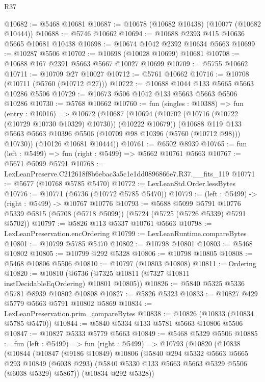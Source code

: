 \begin{lexlean}{R37}
\begin{coremodule}
@10682 := @5468 @10681
@10687 := @10678 (@10682 @10438) (@10077 (@10682 @10444))
@10688 := @5746 @10662
@10694 := @10688 @2393 @415 @10636 @5665 @10681 @10438
@10698 := @10674 @1042 @2392 @10634 @5663
@10699 := @10287 @5506
@10702 := @10698 (@10028 @10699) @10681
@10708 := @10688 @167 @2391 @5663 @5667 @10027 @10699
@10709 := @5755 @10662
@10711 := @10709 @27 @10027
@10712 := @5761 @10662
@10716 := @10708 (@10711 (@5760 (@10712 @27)))
@10722 := @10688 @1044 @133 @5665 @5663 @10286 @5506
@10729 := @10673 @506 @1042 @133 @5663 @5663 @5506 @10286
@10730 := @5768 @10662
@10760 := fun (singles : @10388) =>
  fun (entry : @10016) =>
  @10672
    (@10687
      (@10694
        (@10702 (@10716 (@10722 (@10729 @10730 @10329) @10730)) (@10222 @10679))
        (@10688 @119 @133 @5663 @5663 @10396 @5506 (@10709 @98 @10396 (@5760 (@10712 @98))) @10730))
      (@10126 @10681 @10444))
@10761 := @6502 @8939
@10765 := fun (left : @5499) => fun (right : @5499) => @5662 @10761 @5663
@10767 := @5671 @5099 @5791
@10768 := LexLeanPreserve.C212618f8b6ebac3a5c1e1dd0896866e7.R37.__fits_119
@10771 := @5677 (@10768 @5785 @5470)
@10772 := LexLeanStd.Order.lessBytes
@10776 := @10771 (@6736 (@10772 @5785 @5470))
@10779 := (left : @5499) -> (right : @5499) -> @10767 @10776
@10793 := @5688
    @5099
    @5791
    @10776
    @5339
    @5815
    (@5708 (@5718 @5099))
    (@5724 (@5725 (@5726 @5339) @5791 @5702))
@10797 := @5826 @113 @5337 @10761 @5663
@10798 := LexLeanPreservation.encOrdering
@10799 := LexLeanRuntime.compareBytes
@10801 := @10799 @5785 @5470
@10802 := @10798 @10801
@10803 := @5468 @10802
@10805 := @10799 @292 @5328
@10806 := @10798 @10805
@10808 := @5468 @10806 @5506
@10810 := @10797 (@10803 @10808)
@10811 := Ordering
@10820 := @10810 (@6736 (@7325 @10811 (@7327 @10811 instDecidableEqOrdering) @10801 @10805))
@10826 := @5840 @5325 @5336 @5781 @8939 @10802 @10808
@10827 := @5826 @5323
@10833 := @10827 @429 @5779 @5663 @5791 @10802 @5869
@10834 := LexLeanPreservation.prim_compareBytes
@10838 := @10826 (@10833 (@10834 @5785 @5470))
@10844 := @5840 @5334 @133 @5781 @5663 @10806 @5506
@10847 := @10827 @5333 @5779 @5663
@10849 := @5468 @5329 @5506
@10885 := fun (left : @5499) =>
  fun (right : @5499) =>
  @10793
    (@10820
      (@10838
        (@10844
          (@10847
            (@9186 @10849)
            @10806
            (@5840
              @294
              @5332
              @5663
              @5665
              @293
              @10849
              (@6038 @293)
              (@5840 @5330 @133 @5663 @5663 @5329 @5506 (@6038 @5329) @5867))
            (@10834 @292 @5328))

\end{coremodule}
\end{lexlean}
